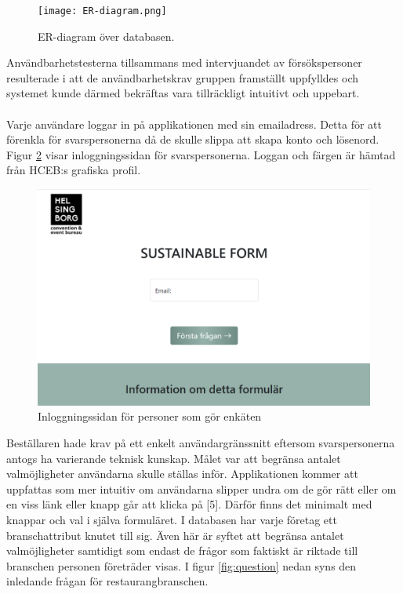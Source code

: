 \documentclass[12pt]{article}
\begin{document}
\begin{figure}
    \centering
    \texttt{[image: ER-diagram.png]}
    \caption{ER-diagram över databasen.}
    \label{fig:ER}
\end{figure}

Användbarhetstesterna tillsammans med intervjuandet av försökspersoner resulterade i att de användbarhetskrav gruppen framställt uppfylldes och systemet kunde därmed bekräftas vara tillräckligt intuitivt och uppebart.\\\\
Varje användare loggar in på applikationen med sin emailadress. Detta för att förenkla för svarspersonerna då de skulle slippa att skapa konto och lösenord. Figur \ref{fig:login} visar inloggningssidan för svarspersonerna. Loggan och färgen är hämtad från HCEB:s grafiska profil. \\

\begin{figure}[H]
    \centering
    \includegraphics[width=12cm]{log_in_page.png}
    \caption{Inloggningssidan för personer som gör enkäten}
    \label{fig:login}
\end{figure}

Beställaren hade krav på ett enkelt användargränssnitt eftersom svarspersonerna antogs ha varierande teknisk kunskap. Målet var att begränsa antalet valmöjligheter användarna skulle ställas inför. Applikationen kommer att uppfattas som mer intuitiv om användarna slipper undra om de gör rätt eller om en viss länk eller knapp går att klicka på [5]. Därför finns det minimalt med knappar och val i själva formuläret. I databasen har varje företag ett branschattribut knutet till sig. Även här är syftet att begränsa antalet valmöjligheter samtidigt som endast de frågor som faktiskt är riktade till branschen personen företräder visas. I figur \ref{fig:question} nedan syns den inledande frågan för restaurangbranschen.
\end{document}
